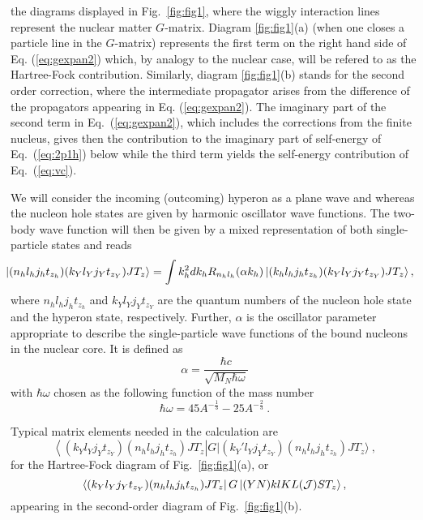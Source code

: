 the diagrams
displayed in Fig.~\ref{fig:fig1}, where the wiggly interaction lines 
represent the nuclear matter $G$-matrix.  Diagram \ref{fig:fig1}(a)
(when one closes a particle line in the $G$-matrix)
represents the first term on the right hand side
of Eq. (\ref{eq:gexpan2}) which, by analogy to the nuclear case, will be
refered to as the Hartree-Fock contribution. Similarly, 
diagram \ref{fig:fig1}(b)
stands for the
second order correction, where the
intermediate propagator arises from the difference of
the propagators appearing in Eq. (\ref{eq:gexpan2}).
The imaginary part of the 
second term in Eq.\ (\ref{eq:gexpan2}), 
which includes the corrections from the finite nucleus, gives then  the
contribution to the imaginary part of self-energy 
of Eq.\ (\ref{eq:2p1h}) below while  the third term 
yields the self-energy contribution of Eq.\ (\ref{eq:vc}).


We will consider the incoming (outcoming) hyperon as a plane wave and
whereas the nucleon hole states are given by harmonic oscillator 
wave functions. The two-body 
wave function will then be given by a mixed representation
of both single-particle states and reads
\begin{equation}
\hspace{-0.3cm}\left | (n_hl_hj_ht_{z_h})(k_Yl_Yj_Yt_{z_Y})JT_z \right \rangle=
    \int k_h^2dk_hR_{n_hl_h}(\alpha k_h)
    \left | (k_hl_hj_ht_{z_h})(k_Yl_Yj_Yt_{z_Y})JT_z \right \rangle,
\label{eq:trans1}
\end{equation}
where $n_hl_hj_ht_{z_h}$ and $k_Yl_Yj_Yt_{z_Y}$ are the quantum numbers of the nucleon hole state
and the hyperon state, respectively. Further, $\alpha$ is the oscillator parameter appropriate 
to describe the single-particle wave functions of the bound
nucleons in the nuclear core. It is defined as
\begin{equation}
   \alpha=\frac{\hbar c}{\sqrt{M_{N}\hbar \omega}}
\label{eq:alfa}
\end{equation} 
with $\hbar \omega$ chosen as the following function of the mass number
\begin{equation} 
   \hbar \omega=45A^{-\frac{1}{3}}-25A^{-\frac{2}{3}} \ .
\label{eq:hachbar}
\end{equation} 

Typical matrix elements needed in the calculation are
\begin{equation}
   \left\langle (k_Yl_Yj_Yt_{z_Y})(n_hl_hj_ht_{z_h})JT_z\right |
    G | (k_{Y}'l_{Y}j_{Y}t_{z_{Y}})(n_{h}l_{h}j_{h}
t_{z_{h}})JT_z \rangle \ ,
\label{eq:g1}
\end{equation}
for the Hartree-Fock diagram of Fig.~\ref{fig:fig1}(a), or
\begin{equation}
   \left\langle (k_Yl_Yj_Yt_{z_Y})(n_hl_hj_ht_{z_h})JT_z \right |
    G\left | (YN)klKL({\cal J})ST_z \right\rangle  ,
\label{eq:g2}
\end{equation}
appearing in the second-order diagram of Fig.~\ref{fig:fig1}(b).

